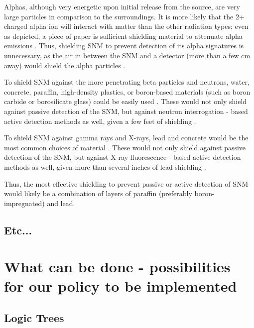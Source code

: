 \documentclass{report}
\begin{document}
Alphas, although very energetic upon initial release from the source, are very large particles in comparison to the surroundings.  It is more likely that the 2+ charged alpha ion will interact with matter than the other radiation types; even as depicted, a piece of paper is sufficient shielding material to attenuate alpha emissions \cite{krane1987introductory}. Thus, shielding SNM to prevent detection of its alpha signatures is unnecessary, as the air in between the SNM and a detector (more than a few cm away) would shield the alpha particles \cite{Cember2008}. 

To shield SNM against the more penetrating beta particles and neutrons, water, concrete, paraffin, high-density plastics, or boron-based materials (such as boron carbide or borosilicate glass) could be easily used \cite{Cember2008}. These would not only shield against passive detection of the SNM, but against neutron interrogation - based active detection methods as well, given a few feet of shielding \cite{Grogan201362}.

To shield SNM against gamma rays and X-rays, lead and concrete would be the most common choices of material \cite{Cember2008}.  These would not only shield against passive detection of the SNM, but against X-ray fluorescence - based active detection methods as well, given more than several inches of lead shielding \cite{PhysRevC.78.041601,Grogan201362,Bertozzi2005}.

Thus, the most  effective shielding to prevent passive or active detection of SNM would likely be a combination of layers of paraffin (preferably boron-impregnated) and lead.





\section{Etc...}







\chapter{What can be done - possibilities for our policy to be implemented}

\section{Logic Trees}
\end{document}

